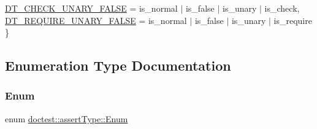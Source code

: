 \begin{DoxyCompactItemize}
\mbox{\hyperlink{namespacedoctest_1_1assert_type_ae1bb5bed722f34f1c38b83cb19d326d3ae8c9c5080e302b840ab4e053d5160191}{D\+T\+\_\+\+C\+H\+E\+C\+K\+\_\+\+U\+N\+A\+R\+Y\+\_\+\+F\+A\+L\+SE}} = is\+\_\+normal $\vert$ is\+\_\+false $\vert$ is\+\_\+unary $\vert$ is\+\_\+check, 
\newline
\mbox{\hyperlink{namespacedoctest_1_1assert_type_ae1bb5bed722f34f1c38b83cb19d326d3a23caa06098e51bbb331da066e98ebd4e}{D\+T\+\_\+\+R\+E\+Q\+U\+I\+R\+E\+\_\+\+U\+N\+A\+R\+Y\+\_\+\+F\+A\+L\+SE}} = is\+\_\+normal $\vert$ is\+\_\+false $\vert$ is\+\_\+unary $\vert$ is\+\_\+require
 \}
\end{DoxyCompactItemize}


\subsection{Enumeration Type Documentation}
\mbox{\label{namespacedoctest_1_1assert_type_ae1bb5bed722f34f1c38b83cb19d326d3}} 
\subsubsection{\texorpdfstring{Enum}{Enum}}
{\footnotesize\ttfamily enum \mbox{\hyperlink{namespacedoctest_1_1assert_type_ae1bb5bed722f34f1c38b83cb19d326d3}{doctest\+::assert\+Type\+::\+Enum}}}

